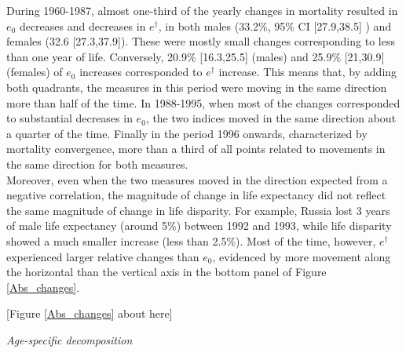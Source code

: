\documentclass{article}
\begin{document}
\begin{spacing}{1.5}
During 1960-1987, almost one-third of the yearly changes in mortality resulted in $e_0$ decreases and decreases in $e^\dagger$, in both males (33.2\%, 95\% CI [27.9,38.5] ) and females (32.6 [27.3,37.9]). These were mostly small changes corresponding to less than one year of life. Conversely, 20.9\% [16.3,25.5] (males) and 25.9\% [21,30.9](females) of $e_0$ increases corresponded to $e^\dagger$ increase. This means that, by adding both quadrants, the measures in this period were moving in the same direction more than half of the time.  In 1988-1995, when most of the changes corresponded to substantial decreases in $e_0$, the two indices moved in the same direction about a quarter of the time. Finally in the period 1996 onwards, characterized by mortality convergence, more than a third of all points related to movements in the same direction for both measures. \\

Moreover, even when the two measures moved in the direction expected from a negative correlation, the magnitude of change in life expectancy did not reflect the same magnitude of change in life disparity. For example, Russia lost 3 years of male life expectancy (around 5\%) between 1992 and 1993, while life disparity showed a much smaller increase (less than 2.5\%). Most of the time, however, $e^\dagger$ experienced larger relative changes than $e_0$, evidenced by more movement along the horizontal than the vertical axis in the bottom panel of Figure \ref{Abs_changes}.


\begin{center}
[Figure \ref{Abs_changes} about here]
\end{center}

\emph{Age-specific decomposition}\\




\end{spacing}
\end{document}
